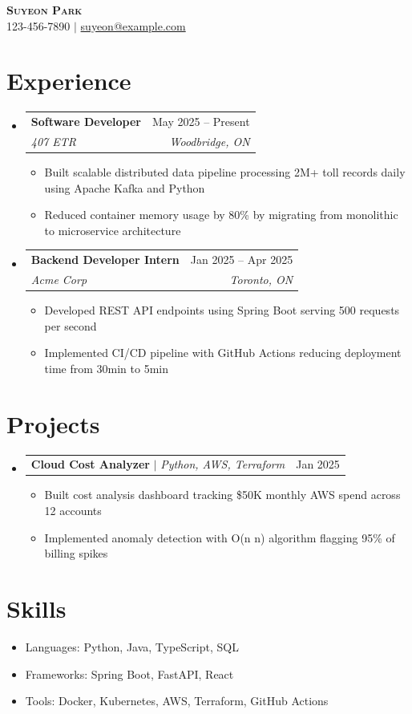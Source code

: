 \documentclass[letterpaper,11pt]{article}
\makeatletter
\newcommand{\resumeSubheading}[4]{
  \vspace{-2pt}\item
    \begin{tabular*}{0.97\textwidth}[t]{l@{\extracolsep{\fill}}r}
      \textbf{#1} & #2 \\
      \textit{\small#3} & \textit{\small #4} \\
    \end{tabular*}\vspace{-7pt}
}
\newcommand{\resumeItem}[1]{
  \item\small{#1 \vspace{-2pt}}
}
\newcommand{\resumeProjectHeading}[2]{
    \item
    \begin{tabular*}{0.97\textwidth}{l@{\extracolsep{\fill}}r}
      \small#1 & \small #2 \\
    \end{tabular*}\vspace{-7pt}
}
\newcommand{\resumeSubHeadingListStart}{\begin{itemize}[leftmargin=0.15in, label={}]}
\newcommand{\resumeSubHeadingListEnd}{\end{itemize}}
\newcommand{\resumeItemListStart}{\begin{itemize}}
\newcommand{\resumeItemListEnd}{\end{itemize}\vspace{-5pt}}
\makeatother
\begin{document}
\begin{center}
    \textbf{\Huge \scshape Suyeon Park} \\ \vspace{1pt}
    \small 123-456-7890 $|$ \href{mailto:suyeon@example.com}{suyeon@example.com}
\end{center}

\section{Experience}
  \resumeSubHeadingListStart
    \resumeSubheading
      {Software Developer}{May 2025 -- Present}
      {407 ETR}{Woodbridge, ON}
      \resumeItemListStart
        \resumeItem{Built scalable distributed data pipeline processing 2M+ toll records daily using Apache Kafka and Python}
        \resumeItem{Reduced container memory usage by 80\% by migrating from monolithic to microservice architecture}
      \resumeItemListEnd
    \resumeSubheading
      {Backend Developer Intern}{Jan 2025 -- Apr 2025}
      {Acme Corp}{Toronto, ON}
      \resumeItemListStart
        \resumeItem{Developed REST API endpoints using Spring Boot serving 500 requests per second}
        \resumeItem{Implemented CI/CD pipeline with GitHub Actions reducing deployment time from 30min to 5min}
      \resumeItemListEnd
  \resumeSubHeadingListEnd

\section{Projects}
  \resumeSubHeadingListStart
    \resumeProjectHeading
      {\textbf{Cloud Cost Analyzer} $|$ \emph{Python, AWS, Terraform}}{Jan 2025}
      \resumeItemListStart
        \resumeItem{Built cost analysis dashboard tracking \$50K monthly AWS spend across 12 accounts}
        \resumeItem{Implemented anomaly detection with O(n \log n) algorithm flagging 95\% of billing spikes}
      \resumeItemListEnd
  \resumeSubHeadingListEnd

\section{Skills}
  \resumeSubHeadingListStart
    \resumeItem{Languages: Python, Java, TypeScript, SQL}
    \resumeItem{Frameworks: Spring Boot, FastAPI, React}
    \resumeItem{Tools: Docker, Kubernetes, AWS, Terraform, GitHub Actions}
  \resumeSubHeadingListEnd
\end{document}
